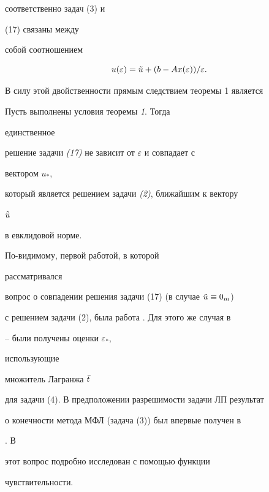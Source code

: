 соответственно задач (3) и


(17) связаны между


собой соотношением


$$


u(\varepsilon)=\Tilde u+(b-Ax(\varepsilon))/\varepsilon.


$$





В силу этой двойственности прямым следствием теоремы 1 является





\begin{thm} Пусть выполнены условия теоремы {\em 1}. Тогда


единственное


решение задачи {\em (17)} не зависит от $\varepsilon$ и совпадает с


вектором $u_*$,


который является решением задачи {\em (2)}, ближайшим к вектору


$\Tilde u$


в евклидовой норме.


\end{thm}





\begin{note} По-видимому, первой работой, в которой


рассматривался


вопрос о совпадении решения задачи (17) (в случае $\Tilde u\equiv 0_m$)


с решением задачи (2), была работа \cite{Ud}. Для этого же случая в


\cite{Er}--\cite{Man2} были получены оценки $\varepsilon_*$,


использующие


множитель Лагранжа $\Bar t$


для задачи (4). В предположении разрешимости задачи ЛП результат


о конечности метода МФЛ (задача (3)) был впервые получен в


\cite{Pol2}. В


\cite{Gol} этот вопрос подробно исследован с помощью функции


чувствительности.


\end{note}






